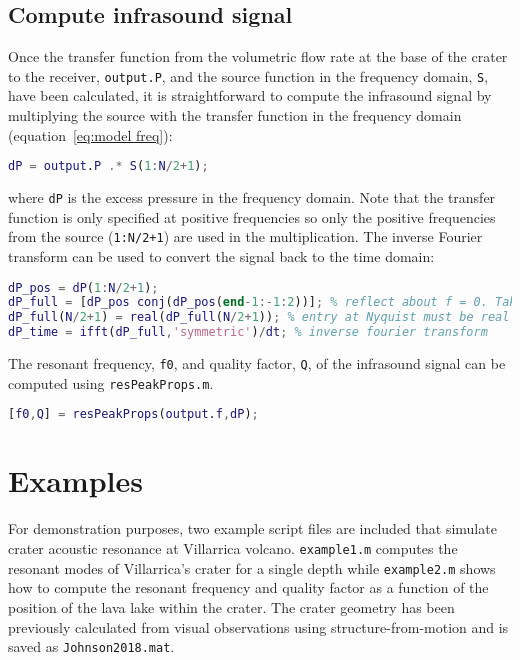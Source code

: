 \documentclass[10pt]{article}
\begin{document}
\subsection{Compute infrasound signal}
 Once the transfer function from the volumetric flow rate at the base of the crater to the receiver, \texttt{output.P}, and the source function in the frequency domain, \texttt{S}, have been calculated, it is straightforward to compute the infrasound signal by multiplying the source with the transfer function in the frequency domain (equation~\ref{eq:model freq}):
\begin{lstlisting}[language=Matlab]
dP = output.P .* S(1:N/2+1);
\end{lstlisting}
where \texttt{dP} is the excess pressure in the frequency domain. Note that the transfer function is only specified at positive frequencies so only the positive frequencies from the source (\texttt{1:N/2+1}) are used in the multiplication. The inverse Fourier transform can be used to convert the signal back to the time domain:
\begin{lstlisting}[language=Matlab]
dP_pos = dP(1:N/2+1);
dP_full = [dP_pos conj(dP_pos(end-1:-1:2))]; % reflect about f = 0. Take complex conjugate for negative frequencies
dP_full(N/2+1) = real(dP_full(N/2+1)); % entry at Nyquist must be real
dP_time = ifft(dP_full,'symmetric')/dt; % inverse fourier transform
\end{lstlisting}

The resonant frequency, \texttt{f0}, and quality factor, \texttt{Q}, of the infrasound signal can be computed using \texttt{resPeakProps.m}.
\begin{lstlisting}[language=Matlab]
[f0,Q] = resPeakProps(output.f,dP);
\end{lstlisting}



\newpage
\section{Examples}

For demonstration purposes, two example script files are included that simulate crater acoustic resonance at Villarrica volcano. \texttt{example1.m} computes the resonant modes of Villarrica's crater for a single depth while \texttt{example2.m} shows how to compute the resonant frequency and quality factor as a function of the position of the lava lake within the crater. The crater geometry has been previously calculated from visual observations using structure-from-motion \citep{Johnson2018} and is saved as \texttt{Johnson2018.mat}.
\end{document}
